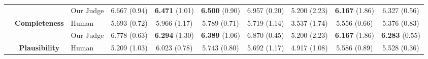 \documentclass{article}
\begin{document}
\begin{center}
{\begin{tabular}{@{}c c l c c c c c c c@{}}
 & & Our Judge & 6.667 {\fontsize{7.2pt}{8.6pt}\selectfont\textcolor{stdgray}{(0.94)}} & \cellcolor{greenlight}\textbf{6.471} {\fontsize{7.2pt}{8.6pt}\selectfont\textcolor{stdgray}{(1.01)}} & \cellcolor{greenlight}\textbf{6.500} {\fontsize{7.2pt}{8.6pt}\selectfont\textcolor{stdgray}{(0.90)}} & 6.957 {\fontsize{7.2pt}{8.6pt}\selectfont\textcolor{stdgray}{(0.20)}} & 5.200 {\fontsize{7.2pt}{8.6pt}\selectfont\textcolor{stdgray}{(2.23)}} & \cellcolor{greenlight}\textbf{6.167} {\fontsize{7.2pt}{8.6pt}\selectfont\textcolor{stdgray}{(1.86)}} & 6.327 {\fontsize{7.2pt}{8.6pt}\selectfont\textcolor{stdgray}{(0.56)}} \\
\cmidrule{2-10}
 & \multirow{2}{*}{\textcolor{grpFidel}{\textbf{Completeness}}} & Human & 5.693 {\fontsize{7.2pt}{8.6pt}\selectfont\textcolor{stdgray}{(0.72)}} & 5.966 {\fontsize{7.2pt}{8.6pt}\selectfont\textcolor{stdgray}{(1.17)}} & 5.789 {\fontsize{7.2pt}{8.6pt}\selectfont\textcolor{stdgray}{(0.71)}} & 5.719 {\fontsize{7.2pt}{8.6pt}\selectfont\textcolor{stdgray}{(1.14)}} & 3.537 {\fontsize{7.2pt}{8.6pt}\selectfont\textcolor{stdgray}{(1.74)}} & 5.556 {\fontsize{7.2pt}{8.6pt}\selectfont\textcolor{stdgray}{(0.66)}} & 5.376 {\fontsize{7.2pt}{8.6pt}\selectfont\textcolor{stdgray}{(0.83)}} \\
 & & Our Judge & 6.778 {\fontsize{7.2pt}{8.6pt}\selectfont\textcolor{stdgray}{(0.63)}} & \cellcolor{greendark}\textbf{6.294} {\fontsize{7.2pt}{8.6pt}\selectfont\textcolor{stdgray}{(1.30)}} & \cellcolor{greenlight}\textbf{6.389} {\fontsize{7.2pt}{8.6pt}\selectfont\textcolor{stdgray}{(1.06)}} & 6.870 {\fontsize{7.2pt}{8.6pt}\selectfont\textcolor{stdgray}{(0.45)}} & 5.200 {\fontsize{7.2pt}{8.6pt}\selectfont\textcolor{stdgray}{(2.23)}} & \cellcolor{greenlight}\textbf{6.167} {\fontsize{7.2pt}{8.6pt}\selectfont\textcolor{stdgray}{(1.86)}} & \cellcolor{greenlight}\textbf{6.283} {\fontsize{7.2pt}{8.6pt}\selectfont\textcolor{stdgray}{(0.55)}} \\
\cmidrule{2-10}
 & \multirow{2}{*}{\textcolor{grpFidel}{\textbf{Plausibility}}} & Human & 5.209 {\fontsize{7.2pt}{8.6pt}\selectfont\textcolor{stdgray}{(1.03)}} & 6.023 {\fontsize{7.2pt}{8.6pt}\selectfont\textcolor{stdgray}{(0.78)}} & 5.743 {\fontsize{7.2pt}{8.6pt}\selectfont\textcolor{stdgray}{(0.80)}} & 5.692 {\fontsize{7.2pt}{8.6pt}\selectfont\textcolor{stdgray}{(1.17)}} & 4.917 {\fontsize{7.2pt}{8.6pt}\selectfont\textcolor{stdgray}{(1.08)}} & 5.586 {\fontsize{7.2pt}{8.6pt}\selectfont\textcolor{stdgray}{(0.89)}} & 5.528 {\fontsize{7.2pt}{8.6pt}\selectfont\textcolor{stdgray}{(0.36)}} \\

\end{tabular}}
\end{center}
\end{document}
